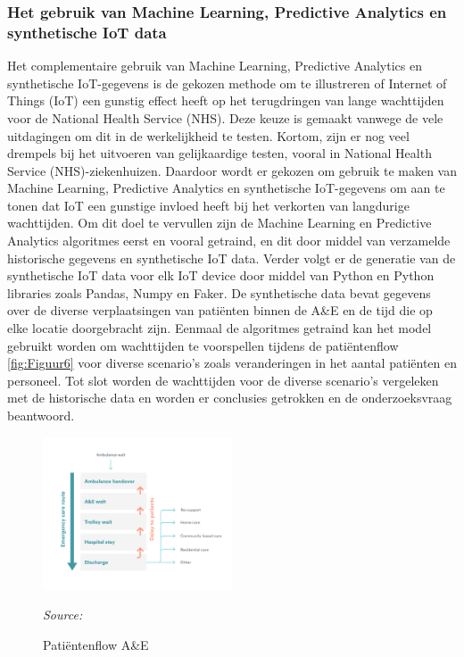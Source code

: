 \subsubsection*{Het gebruik van Machine Learning, Predictive Analytics en synthetische IoT data}
Het complementaire gebruik van Ma\-chi\-ne Lear\-ning, Predictive Analytics en synthetische IoT-\-ge\-ge\-vens is de gekozen methode om te illustreren of Internet of Things (IoT) een gunstig effect heeft op het terugdringen van lange wachttijden voor de National Health Service (NHS). Deze keuze is gemaakt vanwege de vele uitdagingen om dit in de werkelijkheid te testen. Kortom, zijn er nog veel drempels bij het uitvoeren van gelijkaardige testen, vooral in National Health Service (NHS)-ziekenhuizen. Daardoor wordt er gekozen om gebruik te maken van Machine Learning, Predictive Analytics en synthetische IoT-gegevens om aan te tonen dat IoT een gunstige invloed heeft bij het verkorten van langdurige wachttijden. Om dit doel te vervullen zijn de Machine Learning en Predictive Analytics algoritmes eerst en vooral getraind, en dit door middel van verzamelde historische gegevens en synthetische IoT data. Verder volgt er de generatie van de synthetische IoT data voor elk IoT device door middel van Python en Python libraries zoals Pandas, Numpy en Faker. De synthetische data bevat gegevens over de diverse verplaatsingen van patiënten binnen de A\&E en de tijd die op elke locatie doorgebracht zijn. Eenmaal de algoritmes getraind kan het model gebruikt worden om wachttijden te voorspellen tijdens de patiëntenflow \ref{fig:Figuur6} voor diverse scenario's zoals veranderingen in het aantal patiënten en personeel. Tot slot worden de wachttijden voor de diverse scenario's vergeleken met de historische data en worden er conclusies getrokken en de onderzoeksvraag beantwoord.

\begin{figure}[h]
    \centering
    \includegraphics[width=0.5\textwidth]{img/Figuur-7}
    \caption{Patiëntenflow A\&E}
    \label{fig:Figuur7}
    \textit{Source: \autocite{Morris}}
\end{figure}

